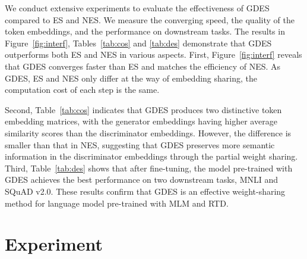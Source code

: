 We conduct extensive experiments to evaluate the effectiveness of GDES compared to ES and NES. We measure the converging speed, the quality of the token embeddings, and the performance on downstream tasks. The results in Figure~\ref{fig:interf}, Tables~\ref{tab:cos} and \ref{tab:des} demonstrate that GDES outperforms both ES and NES in various aspects. First, Figure~\ref{fig:interf} reveals that GDES converges faster than ES and matches the efficiency of NES. As GDES, ES and NES only differ at the way of embedding sharing, the computation cost of each step is the same.

Second, Table~\ref{tab:cos} indicates that GDES produces two distinctive token embedding matrices, with the generator embeddings having higher average similarity scores than the discriminator embeddings. However, the difference is smaller than that in NES, suggesting that GDES preserves more semantic information in the discriminator embeddings through the partial weight sharing. Third, Table~\ref{tab:des} shows that after fine-tuning, the model pre-trained with GDES achieves the best performance on two downstream tasks, MNLI and SQuAD v2.0. These results confirm that GDES is an effective weight-sharing method for language model pre-trained with MLM and RTD.

\section{Experiment}
\label{sec:exp}
